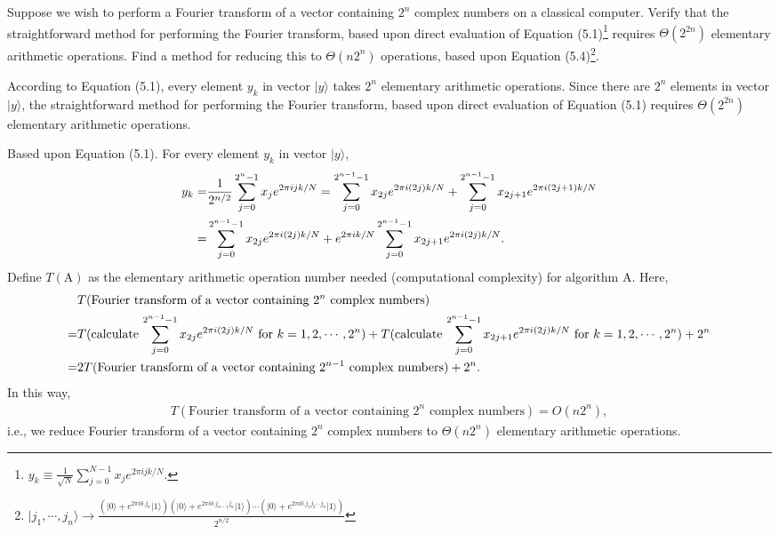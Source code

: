 \documentclass[en]{sol-man}
\begin{document}
\begin{exe}
    Suppose we wish to perform a Fourier transform of a vector containing $2^n$ complex numbers on a classical computer. Verify that the straightforward method for performing the Fourier transform, based upon direct evaluation of Equation (5.1)\footnote{\label{Equ-5.1}$y_k\equiv\frac{1}{\sqrt{N}}\sum_{j=0}^{N-1}x_je^{2\pi ijk/N}$.} requires $\Theta(2^{2n})$ elementary arithmetic operations. Find a method for reducing this to $\Theta(n2^n)$ operations, based upon Equation (5.4)\footnote{\label{Equ-5.4}$\lvert j_1,\cdots,j_n\rangle\rightarrow\frac{\left(\lvert 0\rangle+e^{2\pi i0.j_n}\lvert 1\rangle\right)\left(\lvert 0\rangle+e^{2\pi i0.j_{n-1}j_n}\lvert 1\rangle\right)\cdots\left(\lvert 0\rangle+e^{2\pi i0.j_1j_2\cdots j_n}\lvert 1\rangle\right)}{2^{n/2}}$}.
\end{exe}
\begin{sol}
    According to Equation (5.1), every element $y_k$ in vector $\lvert y\rangle$ takes $2^n$ elementary arithmetic operations. Since there are $2^n$ elements in vector $\lvert y\rangle$, the straightforward method for performing the Fourier transform, based upon direct evaluation of Equation (5.1) requires $\Theta(2^{2n})$ elementary arithmetic operations.

    Based upon Equation (5.1). For every element $y_k$ in vector $\lvert y\rangle$,
    \begin{align}
        \notag y_k=&\frac{1}{2^{n/2}}\sum_{j=0}^{2^n-1}x_je^{2\pi ijk/N}=\sum_{j=0}^{2^{n-1}-1}x_{2j}e^{2\pi i(2j)k/N}+\sum_{j=0}^{2^{n-1}-1}x_{2j+1}e^{2\pi i(2j+1)k/N}\\
        =&\sum_{j=0}^{2^{n-1}-1}x_{2j}e^{2\pi i(2j)k/N}+e^{2\pi ik/N}\sum_{j=0}^{2^{n-1}-1}x_{2j+1}e^{2\pi i(2j)k/N}.
    \end{align}
    Define $T(\text{A})$ as the elementary arithmetic operation number needed (computational complexity) for algorithm A. Here,
    \begin{align}
        \notag&T(\text{Fourier transform of a vector containing $2^n$ complex numbers})\\
        \notag=&T(\text{calculate $\sum_{j=0}^{2^{n-1}-1}x_{2j}e^{2\pi i(2j)k/N}$ for }k=1,2,\cdots,2^n)+T(\text{calculate $\sum_{j=0}^{2^{n-1}-1}x_{2j+1}e^{2\pi i(2j)k/N}$ for }k=1,2,\cdots,2^n)+2^n\\
        \notag=&2T(\text{Fourier transform of a vector containing $2^{n-1}$ complex numbers})+2^n.
    \end{align}
    In this way,
    \begin{align}
        T(\text{Fourier transform of a vector containing $2^n$ complex numbers})=O(n2^n),
    \end{align}
    i.e., we reduce Fourier transform of a vector containing $2^n$ complex numbers to $\Theta(n2^n)$ elementary arithmetic operations.
\end{sol}

\ifx\allfiles\undefined
\end{document}
